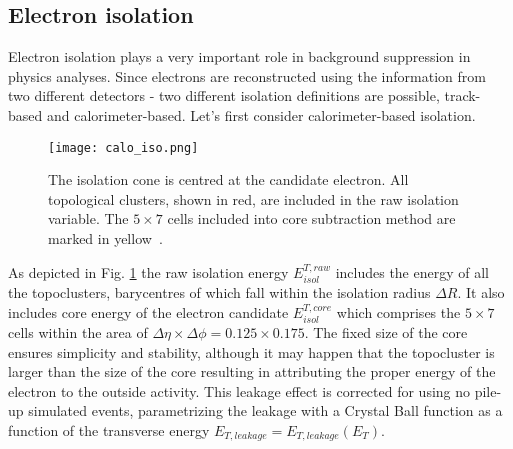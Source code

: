     \subsection{Electron isolation}
    Electron isolation plays a very important role in background suppression in physics analyses. Since electrons are reconstructed using the information from two different detectors - two different isolation definitions are possible, track-based and calorimeter-based. Let's first consider calorimeter-based isolation.
    
	 \begin{figure}[htbp]
		\centering
		\texttt{[image: calo\_iso.png]}
		\caption[Isolation plot]{The isolation cone is centred at the candidate electron. All topological clusters, shown in red, are included in the raw isolation variable. The $5\times 7$ cells included into core subtraction method are marked in yellow~\cite{topoclust_2019}.}
		\label{fig::calo_iso}
	\end{figure}
	As depicted in Fig. \ref{fig::calo_iso} the raw isolation energy $E_{isol}^{T,raw}$ includes the energy of all the topoclusters, barycentres of which fall within the isolation radius $\Delta R$. It also includes core energy of the electron candidate $E_{isol}^{T,core}$ which comprises the $5\times 7$ cells within the area of $\Delta \eta \times \Delta \phi = 0.125 \times 0.175$. The fixed size of the core ensures simplicity and stability, although it may happen that the topocluster is larger than the size of the core resulting in attributing the proper energy of the electron to the outside activity. This leakage effect is corrected for using no pile-up simulated events, parametrizing the leakage with a Crystal Ball function as a function of the transverse energy $E_{T,leakage}=E_{T,leakage}(E_T)$.
	
